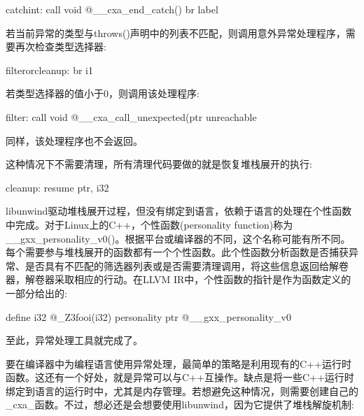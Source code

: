 \begin{shell}
catchint:
call void @__cxa_end_catch()
br label %
\end{shell}

若当前异常的类型与throws()声明中的列表不匹配，则调用意外异常处理程序，需要再次检查类型选择器:

\begin{shell}
filterorcleanup:
br i1 %
\end{shell}

若类型选择器的值小于0，则调用该处理程序:

\begin{shell}
filter:
call void @__cxa_call_unexpected(ptr %
unreachable
\end{shell}

同样，该处理程序也不会返回。

这种情况下不需要清理，所有清理代码要做的就是恢复堆栈展开的执行:

\begin{shell}
cleanup:
resume { ptr, i32 } %
\end{shell}

libunwind驱动堆栈展开过程，但没有绑定到语言，依赖于语言的处理在个性函数中完成。对于Linux上的C++，个性函数(personality function)称为\_\_gxx\_personality\_v0()。根据平台或编译器的不同，这个名称可能有所不同。每个需要参与堆栈展开的函数都有一个个性函数。此个性函数分析函数是否捕获异常、是否具有不匹配的筛选器列表或是否需要清理调用，将这些信息返回给解卷器，解卷器采取相应的行动。在LLVM IR中，个性函数的指针是作为函数定义的一部分给出的:

\begin{shell}
define i32 @_Z3fooi(i32) personality ptr @__gxx_personality_v0
\end{shell}

至此，异常处理工具就完成了。

要在编译器中为编程语言使用异常处理，最简单的策略是利用现有的C++运行时函数。这还有一个好处，就是异常可以与C++互操作。缺点是将一些C++运行时绑定到语言的运行时中，尤其是内存管理。若想避免这种情况，则需要创建自己的\_cxa\_函数。不过，想必还是会想要使用libunwind，因为它提供了堆栈解旋机制:

